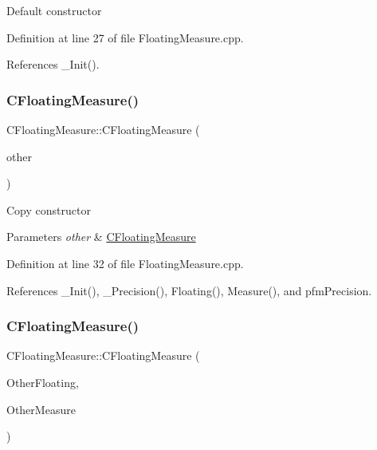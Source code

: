 Default constructor 

Definition at line 27 of file Floating\+Measure.\+cpp.



References \+\_\+\+Init().

\mbox{\label{classCFloatingMeasure_ac5f28ce988a77d1bc8b34b361827788c}} 
\subsubsection{\texorpdfstring{C\+Floating\+Measure()}{CFloatingMeasure()}\hspace{0.1cm}{\footnotesize\ttfamily [2/3]}}
{\footnotesize\ttfamily C\+Floating\+Measure\+::\+C\+Floating\+Measure (\begin{DoxyParamCaption}\item[{const \hyperlink{classCFloatingMeasure}{C\+Floating\+Measure} \&}]{other }\end{DoxyParamCaption})}

Copy constructor


\begin{DoxyParams}{Parameters}
{\em other} & \hyperlink{classCFloatingMeasure}{C\+Floating\+Measure} \\
\hline
\end{DoxyParams}


Definition at line 32 of file Floating\+Measure.\+cpp.



References \+\_\+\+Init(), \+\_\+\+Precision(), Floating(), Measure(), and pfm\+Precision.

\mbox{\label{classCFloatingMeasure_a8ce55143653895584c3f578103308714}} 
\subsubsection{\texorpdfstring{C\+Floating\+Measure()}{CFloatingMeasure()}\hspace{0.1cm}{\footnotesize\ttfamily [3/3]}}
{\footnotesize\ttfamily C\+Floating\+Measure\+::\+C\+Floating\+Measure (\begin{DoxyParamCaption}\item[{const \hyperlink{classCDigFloat}{C\+Dig\+Float} \&}]{Other\+Floating,  }\item[{const \hyperlink{classCComplexMeasure}{C\+Complex\+Measure} \&}]{Other\+Measure }\end{DoxyParamCaption})}



